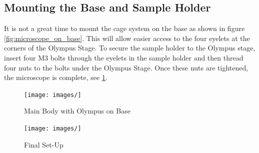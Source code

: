 \documentclass[runningheads]{llncs}
\begin{document}
\subsection{Mounting the Base and Sample Holder}

It is not a great time to mount the cage system on the base as shown in figure \ref{fig:microscope_on_base}. This will allow easier access to the four eyelets at the corners of the Olympus Stage. To secure the sample holder to the Olympus stage, insert four M3 bolts through the eyelets in the sample holder and then thread four nuts to the bolts under the Olympus Stage. Once these nuts are tightened, the microscope is complete, see \ref{fig:complete_microscope}. 

\begin{figure}
    \centering
    \begin{minipage}[b]{0.5\textwidth}
        \texttt{[image: images/]}
        \caption{Main Body with Olympus on Base}
        \label{fig:microscope_on_base}
    \end{minipage}
    \hfill
    \begin{minipage}[b]{0.5\textwidth}
        \texttt{[image: images/]}
        \caption{Final Set-Up}
        \label{fig:complete_microscope}
    \end{minipage}
\end{figure}
\end{document}
